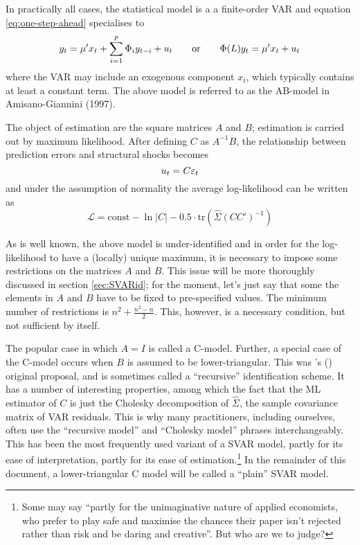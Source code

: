 \documentclass[a4paper,10pt]{article}
\newcommand{\PrE}[1]{\ensuremath u_{#1}} %
\newcommand{\StS}[1]{\ensuremath \varepsilon_{#1}} %
\newcommand{\VarSym}{\ensuremath \Phi}
\begin{document}
In practically all cases, the statistical model is a a finite-order
VAR and equation \eqref{eq:one-step-ahead} specialises to
\begin{equation}
  \label{eq:VAR}
  y_t = \mu' x_t + \sum_{i=1}^p \VarSym_i y_{t-i} + \PrE{t}
  \qquad\mathrm{or}\qquad
  \VarSym(L) y_t = \mu' x_t + \PrE{t}
\end{equation}
where the VAR may include an exogenous component $x_t$, which
typically contains at least a constant term. The above model is
referred to as the AB-model in Amisano-Giannini (1997).

The object of estimation are the square matrices $A$ and $B$;
estimation is carried out by maximum likelihood. After defining $C$ as
$A^{-1}B$, the relationship between prediction errors and structural
shocks becomes
\begin{equation}
  \label{eq:PrE-StS-C}
  \PrE{t} = C \StS{t}
\end{equation}
and under the assumption of normality the average log-likelihood can
be written as
\[
  \mathcal{L} = \mathrm{const} - \ln |C| - 0.5 \cdot
  \mathrm{tr}(\hat{\Sigma} (CC')^{-1}) 
\]

As is well known, the above model is under-identified and in order for
the log-likelihood to have a (locally) unique maximum, it is necessary
to impose some restrictions on the matrices $A$ and $B$. This issue
will be more thoroughly discussed in section \ref{sec:SVARid}; for the
moment, let's just say that some the elements in $A$ and $B$ have to
be fixed to pre-specified values. The minimum number of restrictions
is $n^2 + \frac{n^2 - n}{2}$. This, however, is a necessary condition,
but not sufficient by itself.

The popular case in which $A=I$ is called a C-model. Further, a
special case of the C-model occurs when $B$ is assumed to be
lower-triangular. This was \citeauthor{sims80}'s (\citeyear{sims80})
original proposal, and is sometimes called a ``recursive''
identification scheme. It has a number of interesting properties,
among which the fact that the ML estimator of $C$ is just the Cholesky
decomposition of $\hat{\Sigma}$, the sample covariance matrix of VAR
residuals. This is why many practitioners, including ourselves, often
use the ``recursive model'' and ``Cholesky model'' phrases
interchangeably.  This has been the most frequently used variant of a
SVAR model, partly for its ease of interpretation, partly for its ease
of estimation.\footnote{Some may say ``partly for the unimaginative
  nature of applied economists, who prefer to play safe and maximise
  the chances their paper isn't rejected rather than risk and be
  daring and creative''. But who are we to judge?} In the remainder of
this document, a lower-triangular C model will be called a ``plain''
SVAR model.
\end{document}

